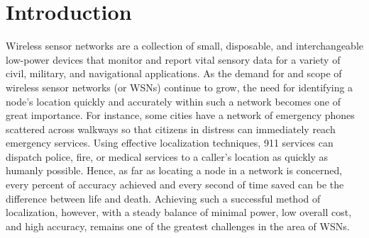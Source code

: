 \documentclass[12pt]{uthesis-v12}  %
\begin{document}


\chapter{Introduction}

Wireless sensor networks are a collection of small, disposable, and interchangeable low-power devices that monitor and report vital sensory data for a variety of civil, military, and navigational applications. As the demand for and scope of wireless sensor networks (or WSNs) continue to grow, the need for identifying a node's location quickly and accurately within such a network becomes one of great importance.  For instance, some cities have a network of emergency phones scattered across walkways so that citizens in distress can immediately reach emergency services. Using effective localization techniques, 911 services can dispatch police, fire, or medical services to a caller's location as quickly as humanly possible. Hence, as far as locating a node in a network is concerned, every percent of accuracy achieved and every second of time saved can be the difference between life and death. Achieving such a successful method of localization, however, with a steady balance of minimal power, low overall cost, and high accuracy, remains one of the greatest challenges in the area of WSNs.
\end{document}
